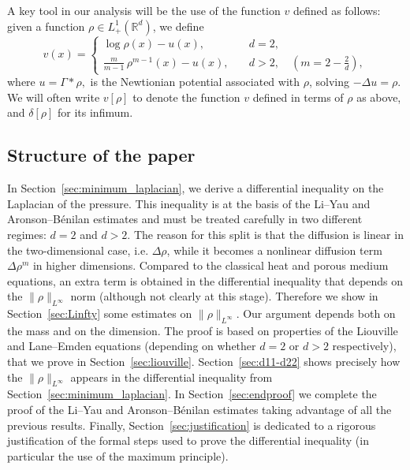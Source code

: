 \documentclass[11pt,a4paper]{article}
\numberwithin{equation}{section}
\newcommand{\R}{{\mathbb{R}}}
\theoremstyle{plain}
\theoremstyle{remark}
\newcommand {\f}{\frac}
\begin{document}
A key tool in our analysis will be the use of the function $v$ defined as follows: given a function $\rho\in L^1_+(\R^d)$, we define
\begin{equation}\label{defiv}
v(x) =
\begin{cases}
\log\rho(x) - u(x), & d=2,\\[3pt]
\displaystyle \f{m}{m-1}\,\rho^{m-1}(x) - u(x), \quad & d>2,\quad\left(m=2-\f{2}{d}\right),
\end{cases}
\end{equation}
where \(
u  = \Gamma\ast\rho,
\) is the Newtionian potential associated with $\rho$, solving $-\Delta u=\rho$.
We will often write $v[\rho]$ to denote the function $v$ defined in terms of $\rho$ as above, and $\delta[\rho]$ for its infimum.


\subsection{Structure of the paper}

In Section~\ref{sec:minimum_laplacian}, we derive a differential inequality on the Laplacian of the pressure. This inequality is at the basis of the Li--Yau and Aronson--B\'enilan estimates and must be treated carefully in two different regimes: $d=2$ and $d>2$. The reason for this split is that the diffusion is linear in the two-dimensional case, i.e. $\Delta\rho$, while it becomes a nonlinear diffusion term $\Delta \rho^m$ in higher dimensions. Compared to the classical heat and porous medium equations, an extra term is obtained in the differential inequality that depends on the $\|\rho\|_{L^\infty}$  norm (although not clearly at this stage). Therefore we show in Section~\ref{sec:Linfty} some estimates on $\|\rho\|_{L^{\infty}}$. Our argument depends both on the mass and on the dimension. The proof is based on properties of the Liouville and Lane--Emden equations (depending on whether $d=2$ or $d>2$ respectively), that we prove in  Section~\ref{sec:liouville}. Section~\ref{sec:d11-d22} shows precisely how the $\|\rho\|_{L^\infty}$ appears in the differential inequality from Section~\ref{sec:minimum_laplacian}. In Section~\ref{sec:endproof} we complete the proof of the Li--Yau and Aronson--B\'enilan estimates taking advantage of all the previous results.  Finally, Section~\ref{sec:justification} is dedicated to a rigorous justification of the formal steps used to prove the differential inequality (in particular the use of the maximum principle). %
\end{document}
